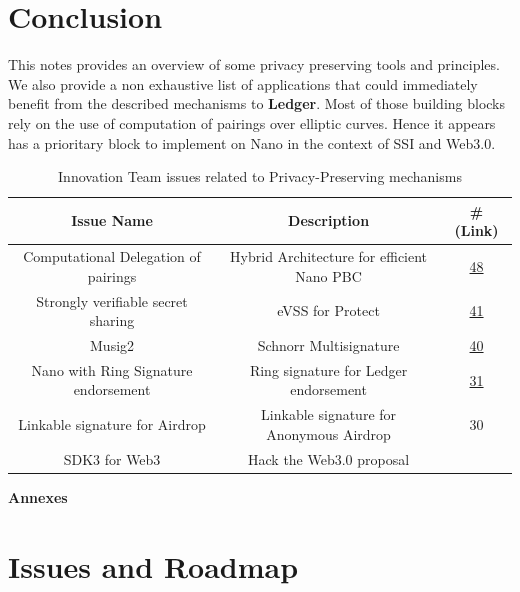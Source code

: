 \documentclass[11pt]{llncs2e/llncs}
\begin{document}
\section{Conclusion} 

This notes provides an overview of some privacy preserving tools and principles. We also provide a non exhaustive list of applications that could immediately benefit from the described mechanisms to {\bf \textregistered Ledger}. Most of those building blocks rely on the use of computation of pairings over elliptic curves. Hence it appears has a prioritary block to implement on Nano in the context of SSI and Web3.0. 

  
\begin{table}
 \begin{center} 
  \begin{tabular}{|c|c|c|}
   \hline
   Issue Name & Description & \# (Link) \\
   \hline
   Computational Delegation of pairings & Hybrid Architecture for efficient Nano PBC& \href{https://github.com/LedgerHQ/innovation/issues/48}{48}\\
   \hline
   Strongly verifiable secret sharing& eVSS for Protect & \href{https://github.com/LedgerHQ/innovation/issues/41}{41}\\
   \hline
   Musig2 &  Schnorr Multisignature& \href{https://github.com/LedgerHQ/innovation/issues/40}{40}\\
   \hline
   Nano with Ring Signature endorsement &  Ring signature for Ledger endorsement& \href{https://github.com/LedgerHQ/innovation/issues/31}{31}\\
   \hline
   Linkable signature for Airdrop & Linkable signature for Anonymous Airdrop& 30 \\
   \hline
   SDK3 for Web3 &Hack the Web3.0 proposal & \\
   \hline
  \end{tabular}

 \end{center} 
\caption{Innovation Team issues related to Privacy-Preserving mechanisms}
\end{table}





\appendix
\newpage
{\noindent\huge{\bf Annexes}}

\section{Issues and Roadmap}
\end{document}
